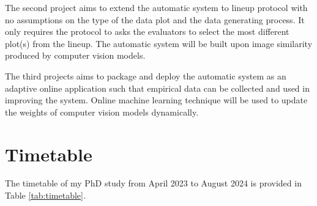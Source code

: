\documentclass[11pt,a4paper,]{article}
\begin{document}
The second project aims to extend the automatic system to lineup protocol with no assumptions on the type of the data plot and the data generating process. It only requires the protocol to asks the evaluators to select the most different plot(s) from the lineup. The automatic system will be built upon image similarity produced by computer vision models.

The third projects aims to package and deploy the automatic system as an adaptive online application such that empirical data can be collected and used in improving the system. Online machine learning technique will be used to update the weights of computer vision models dynamically.

\hypertarget{timetable}{%
\section{Timetable}\label{timetable}}

The timetable of my PhD study from April 2023 to August 2024 is provided in Table \ref{tab:timetable}.

\begin{table}

\caption{\label{tab:timetable}Timetable till thesis submission}
\centering
{}
\end{table}

\printbibliography[title=References]
\end{document}
